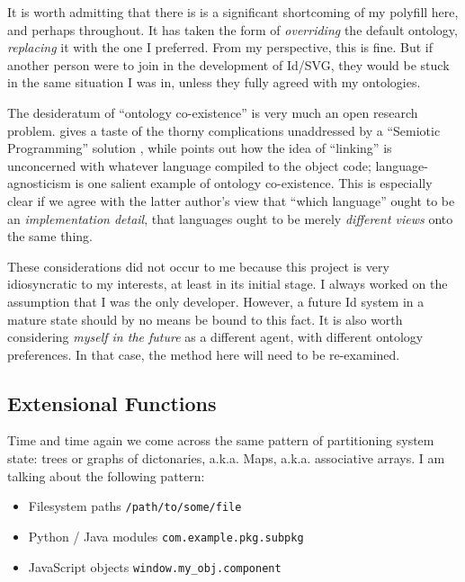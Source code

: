It is worth admitting that there is is a significant shortcoming of my
polyfill here, and perhaps throughout. It has taken the form of
\emph{overriding} the default ontology, \emph{replacing} it with the one
I preferred. From my perspective, this is fine. But if another person
were to join in the development of Id{}/SVG, they would be stuck in the
same situation I was in, unless they fully agreed with my ontologies.

The desideratum of ``ontology co-existence'' is very much an open
research problem. \cite{crit-semprola} gives a taste of the thorny
complications unaddressed by a ``Semiotic Programming'' solution
\cite{semprola}, while \cite{kell-c} points out how the idea of
``linking'' is unconcerned with whatever language compiled to the object
code; language-agnosticism is one salient example of ontology
co-existence. This is especially clear if we agree with the latter
author's view that ``which language'' ought to be an
\emph{implementation detail}, that languages ought to be merely
\emph{different views} onto the same thing.

These considerations did not occur to me because this project is very
idiosyncratic to my interests, at least in its initial stage. I always
worked on the assumption that I was the only developer. However, a
future Id{} system in a mature state should by no means be bound to this
fact. It is also worth considering \emph{myself in the future} as a
different agent, with different ontology preferences. In that case, the
method here will need to be re-examined.

\hypertarget{extensional-functions}{%
\subsection{Extensional Functions}\label{extensional-functions}}

Time and time again we come across the same pattern of partitioning
system state: trees or graphs of dictonaries, a.k.a. Maps, a.k.a.
associative arrays. I am talking about the following pattern:

\begin{itemize}
\tightlist
\item
  Filesystem paths \texttt{/path/to/some/file}
\item
  Python / Java modules \texttt{com.example.pkg.subpkg}
\item
  JavaScript objects \texttt{window.my\_obj.component}
\end{itemize}

